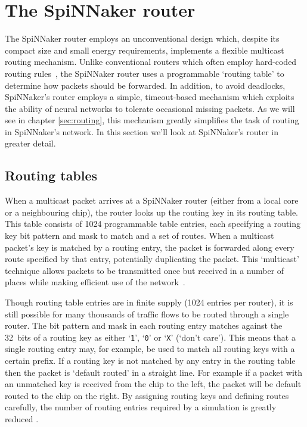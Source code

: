 	\section{The SpiNNaker router}
		
		The SpiNNaker router employs an unconventional design which, despite its
		compact size and small energy requirements, implements a flexible multicast
		routing mechanism. Unlike conventional routers which often employ
		hard-coded routing rules~\cite[chapter~8]{dally04}, the SpiNNaker router
		uses a programmable `routing table' to determine how packets should be
		forwarded.  In addition, to avoid deadlocks, SpiNNaker's router employs a
		simple, timeout-based mechanism which exploits the ability of neural
		networks to tolerate occasional missing packets. As we will see in chapter
		\ref{sec:routing}, this mechanism greatly simplifies the task of routing in
		SpiNNaker's network. In this section we'll look at SpiNNaker's router in
		greater detail.
		
		\subsection{Routing tables}
		
			When a multicast packet arrives at a SpiNNaker router (either from a
			local core or a neighbouring chip), the router looks up the routing key
			in its routing table. This table consists of \num{1024} programmable
			table entries, each specifying a routing key bit pattern and mask to
			match and a set of routes.  When a multicast packet's key is matched by a
			routing entry, the packet is forwarded along every route specified by
			that entry, potentially duplicating the packet. This `multicast'
			technique allows packets to be transmitted once but received in a number
			of places while making efficient use of the network~\cite{navaridas12}.
			
			Though routing table entries are in finite supply (\num{1024} entries per
			router), it is still possible for many thousands of traffic flows to be
			routed through a single router. The bit pattern and mask in each routing
			entry matches against the 32~bits of a routing key as either
			`\texttt{1}', `\texttt{0}' or `\texttt{X}' (`don't care').  This means
			that a single routing entry may, for example, be used to match all
			routing keys with a certain prefix. If a routing key is not matched by
			any entry in the routing table then the packet is `default routed' in a
			straight line. For example if a packet with an unmatched key is received
			from the chip to the left, the packet will be default routed to the chip
			on the right. By assigning routing keys and defining routes carefully,
			the number of routing entries required by a simulation is greatly reduced
			\cite{davies12}.
			

